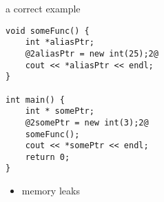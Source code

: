 \begin{frame}[fragile,label=someMemAllocProbsG]{a correct example}
\begin{lstlisting}
void someFunc() {
    int *aliasPtr;
    @2aliasPtr = new int(25);2@
    cout << *aliasPtr << endl;
}

int main() {
    int * somePtr;
    @2somePtr = new int(3);2@
    someFunc();
    cout << *somePtr << endl;
    return 0;
}
\end{lstlisting}
\begin{itemize}
\item<2> memory leaks
\end{itemize}
\end{frame}
